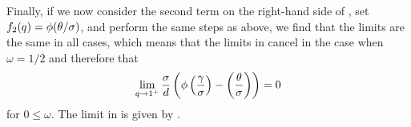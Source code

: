 Finally, if we now consider the second term on the right-hand side of
, set \(f_2(q) = \operatorname{\phi}(\theta/\sigma)\), and perform the
same steps as above, we find that the limits are the same in all cases, which means that
the limits in  cancel in the case when \(\omega = 1/2\)
and therefore that
\[
  \lim_{q \rightarrow 1^+} \frac{\sigma}{d} \left(\operatorname{\phi}\left(\frac{\gamma}{\sigma}\right) - \left(\frac{\theta}{\sigma}\right)\right) = 0
\]
for \(0 \leq \omega \). The limit in  is given by
.
